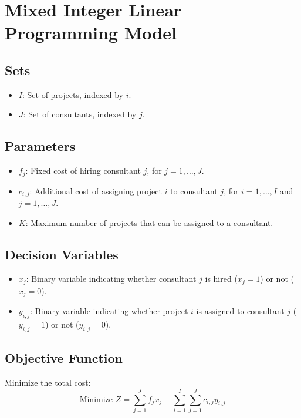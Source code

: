 \documentclass{article}
\begin{document}
\section*{Mixed Integer Linear Programming Model}

\subsection*{Sets}
\begin{itemize}
    \item $I$: Set of projects, indexed by $i$.
    \item $J$: Set of consultants, indexed by $j$.
\end{itemize}

\subsection*{Parameters}
\begin{itemize}
    \item $f_j$: Fixed cost of hiring consultant $j$, for $j = 1, \ldots, J$.
    \item $c_{i,j}$: Additional cost of assigning project $i$ to consultant $j$, for $i = 1, \ldots, I$ and $j = 1, \ldots, J$.
    \item $K$: Maximum number of projects that can be assigned to a consultant.
\end{itemize}

\subsection*{Decision Variables}
\begin{itemize}
    \item $x_{j}$: Binary variable indicating whether consultant $j$ is hired ($x_{j} = 1$) or not ($x_{j} = 0$).
    \item $y_{i,j}$: Binary variable indicating whether project $i$ is assigned to consultant $j$ ($y_{i,j} = 1$) or not ($y_{i,j} = 0$).
\end{itemize}

\subsection*{Objective Function}
Minimize the total cost:
\[
\text{Minimize } Z = \sum_{j=1}^{J} f_j x_j + \sum_{i=1}^{I} \sum_{j=1}^{J} c_{i,j} y_{i,j}
\]
\end{document}
